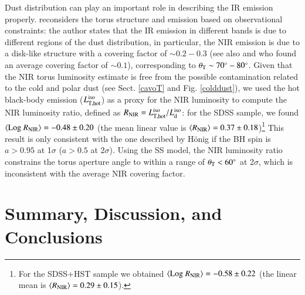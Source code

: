 \documentclass[]{aa}
\begin{document}
Dust distribution can play an important role in describing the IR emission properly. \citet{Honig} reconsiders the torus structure and emission based on observational constraints: the author states that the IR emission in different bands is due to different regions of the dust distribution, in particular, the NIR emission is due to a disk-like structure with a covering factor of $\sim 0.2 - 0.3$ (see also \citealt{MorNet} and \citealt{Landt} who found an average covering factor of $\sim 0.1$), corresponding to $\theta_{\rm T} \sim 70^{\circ} - 80^{\circ}$. Given that the NIR torus luminosity estimate is free from the possible contamination related to the cold and polar dust (see Sect. \ref{cavoT} and Fig. \ref{colddust}), we used the hot black-body emission ($L^{\rm iso}_{\rm T, hot}$) as a proxy for the NIR luminosity to compute the NIR luminosity ratio, defined as $R_{\rm NIR} = L^{\rm iso}_{\rm T, hot} / L^{\rm iso}_{\rm d}$: for the SDSS sample, we found $\langle {\rm Log}\ R_{\rm NIR} \rangle = -0.48 \pm 0.20$ (the mean linear value is $\langle R_{\rm NIR} \rangle = 0.37 \pm 0.18$)\footnote{For the SDSS+HST sample we obtained $\langle {\rm Log}\ R_{\rm NIR} \rangle = -0.58 \pm 0.22$ (the linear mean is $\langle R_{\rm NIR} \rangle = 0.29 \pm 0.15$).} This result is only consistent with the one described by H\"{o}nig if the BH spin is $a>0.95$ at 1$\sigma$ ($a>0.5$ at 2$\sigma$). Using the SS model, the NIR luminosity ratio constrains the torus aperture angle to within a range of $\theta_{\rm T} < 60^{\circ}$ at 2$\sigma$, which is inconsistent with the average NIR covering factor.






















\section{Summary, Discussion, and Conclusions} \label{sec-concl} 
\end{document}
